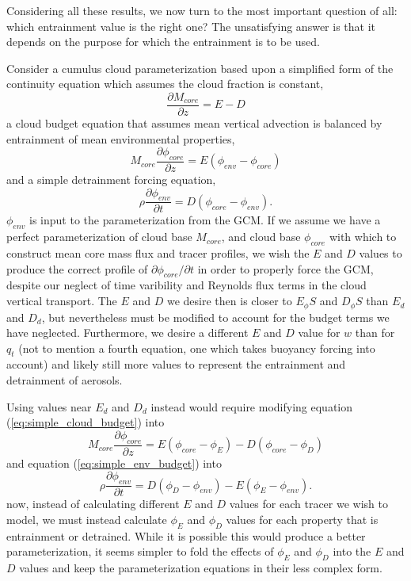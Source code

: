 \documentclass[12pt]{article}
\begin{document}
Considering all these results, we now turn to the most important question of 
all: which entrainment value is the right one?  The unsatisfying answer is that
it depends on the purpose for which the entrainment is to be used.

Consider a cumulus cloud parameterization based upon a simplified form of the continuity equation which assumes the cloud fraction is constant,
\begin{equation}
    \label{eq:simple_continuity}
    \frac{\partial M_{core}}{\partial z} = E - D
\end{equation}
a cloud budget equation that assumes mean vertical advection is balanced by 
entrainment of mean environmental properties,
\begin{equation}
    \label{eq:simple_cloud_budget}
    M_{core} \frac{\partial \phi_{core}}{\partial z} = E(\phi_{env} - \phi_{core})
\end{equation}
and a simple detrainment forcing equation,
\begin{equation}
    \label{eq:simple_env_budget}
    \rho \frac{\partial \phi_{env}}{\partial t} = D(\phi_{core} - \phi_{env}).
\end{equation}
$\phi_{env}$ is input to the parameterization from the GCM.  If we assume we have a perfect parameterization of cloud base $M_{core}$, and cloud base $\phi_{core}$
with which to construct mean core mass flux and tracer profiles, we wish the 
$E$ and $D$ values to produce the correct profile of 
$\partial \phi_{core} / \partial t$ in order to properly force the GCM, despite 
our neglect of time varibility and Reynolds flux terms in the cloud vertical
transport.  The $E$ and $D$ we desire then is closer to $E_\phi S$ and $D_\phi S$ 
than $E_d$ and $D_d$, but nevertheless must be modified to account for the budget
terms we have neglected.  Furthermore, we desire a different $E$ and $D$ value
for $w$ than for $q_t$ (not to mention a fourth equation, one which takes
buoyancy forcing into account) and likely still more values to represent the
entrainment and detrainment of aerosols.

Using values near $E_d$ and $D_d$ instead would require modifying equation 
(\ref{eq:simple_cloud_budget}) into
\begin{equation}
    \label{eq:less_simple_cloud_budget}
    M_{core} \frac{\partial \phi_{core}}{\partial z} 
       = E(\phi_{core} - \phi_E) - D(\phi_{core} - \phi_D)
\end{equation}
and equation (\ref{eq:simple_env_budget}) into
\begin{equation}
    \label{eq:less_simple_env_budget}
    \rho \frac{\partial \phi_{env}}{\partial t} 
       = D(\phi_D - \phi_{env}) - E(\phi_E - \phi_{env}).
\end{equation}
now, instead of calculating different $E$ and $D$ values for each tracer we 
wish to model, we must instead calculate $\phi_E$ and $\phi_D$ values for 
each property that is entrainment or detrained.  While it is possible this would
produce a better parameterization, it seems simpler to fold the effects of 
$\phi_E$ and $\phi_D$ into the $E$ and $D$ values and keep the 
parameterization equations in their less complex form.
\end{document}
